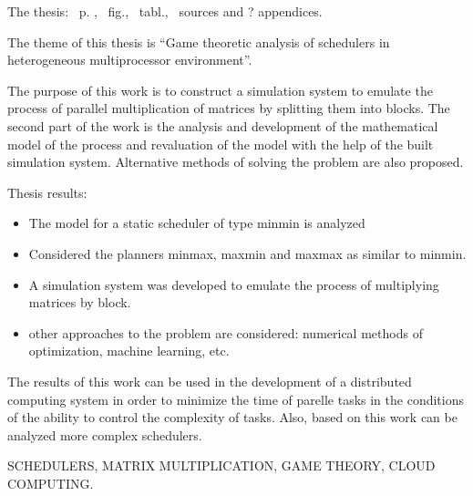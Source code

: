 
The thesis: \pageref*{MyLastPage}~p. , \totfig~fig., \tottab~tabl., ~sources and ? appendices.

The theme of this thesis is ``Game theoretic analysis of schedulers in heterogeneous multiprocessor environment''.

The purpose of this work is to construct a simulation system to emulate the process of parallel multiplication of matrices by splitting them into blocks. The second part of the work is the analysis and development of the mathematical model of the process and revaluation of the model with the help of the built simulation system. Alternative methods of solving the problem are also proposed.

Thesis results:
\begin{itemize}
	\item The model for a static scheduler of type minmin is analyzed
	\item Considered the planners minmax, maxmin and maxmax as similar to minmin.
	\item A simulation system was developed to emulate the process of multiplying matrices by block.
	\item other approaches to the problem are considered: numerical methods of optimization, machine learning, etc.
\end{itemize}

The results of this work can be used in the development of a distributed computing system in order to minimize the time of parelle tasks in the conditions of the ability to control the complexity of tasks. Also, based on this work can be analyzed more complex schedulers.

\MakeUppercase{Schedulers, matrix multiplication, game theory, cloud computing.} 